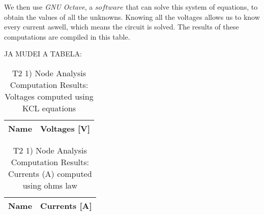 We then use \textit{GNU Octave}, a $software$ that can solve this system of equations, to obtain the values of all the unknowns. Knowing all the voltages allows us to know every current aswell, which means the circuit is solved.
The results of these computations are compiled in this table.


JA MUDEI A TABELA:

\begin{table}[h]
  \centering
  \begin{tabular}{|l|r|}
    \hline    
    {\bf Name} & {\bf Voltages [V]} \\ \hline
    
  \end{tabular}
  \caption{T2 1) Node Analysis Computation Results: Voltages computed using KCL equations}
  \label{tab:nodeCurrents}
\end{table}


\begin{table}[h]
  \centering
  \begin{tabular}{|l|r|}
    \hline    
    {\bf Name} & {\bf Currents [A]} \\ \hline
    
  \end{tabular}
  \caption{T2 1) Node Analysis Computation Results: Currents (A) computed using ohms law}
  \label{tab:nodeCurrents}
\end{table}